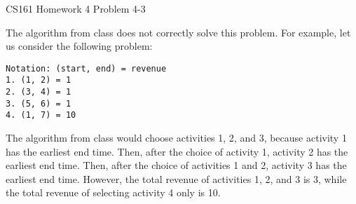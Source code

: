 \documentclass[12pt]{article}
\begin{document}
\begin{center}
{\Large CS161 Homework 4 Problem 4-3}

\end{center}

The algorithm from class does not correctly solve this problem. For example, let us consider the following problem:

\begin{verbatim}
Notation: (start, end) = revenue
1. (1, 2) = 1
2. (3, 4) = 1
3. (5, 6) = 1
4. (1, 7) = 10
\end{verbatim}

The algorithm from class would choose activities 1, 2, and 3, because activity 1 has the earliest end time. Then, after the choice of activity 1, activity 2 has the earliest end time. Then, after the choice of activities 1 and 2, activity 3 has the earliest end time. However, the total revenue of activities 1, 2, and 3 is 3, while the total revenue of selecting activity 4 only is 10. 
\end{document}
